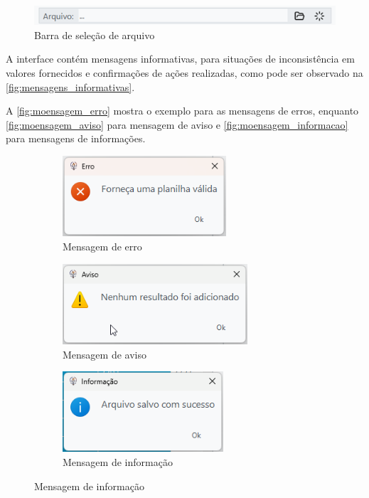 \begin{figure}[H]
	\centering
	\caption{Barra de seleção de arquivo}
	\label{fig:barra_selecao}
	\includegraphics[width=15cm]{illustrations/figures/barra_selecao.png}
\end{figure}

A interface contém mensagens informativas, para situações de inconsistência em valores fornecidos e confirmações de ações realizadas, como pode ser observado na \autoref{fig:mensagens_informativas}.

A \autoref{fig:moensagem_erro} mostra o exemplo para as mensagens de erros, enquanto \autoref{fig:moensagem_aviso} para mensagem de aviso e \autoref{fig:moensagem_informacao} para mensagens de informações.

\begin{figure}[H]
	\centering
	\caption{Mensagens informativas}
  \label{fig:mensagens_informativas}
	\begin{subfigure}{7.5cm}
		\centering
		\includegraphics[height=3cm]{illustrations/figures/mensagem_erro.png}
		\caption{Mensagem de erro}
		\label{fig:moensagem_erro}
	\end{subfigure}
  \begin{subfigure}{7.5cm}
		\centering
		\includegraphics[height=3cm]{illustrations/figures/mensagem_aviso_resultado.png}
		\caption{Mensagem de aviso}
		\label{fig:moensagem_aviso}
	\end{subfigure}
  \begin{subfigure}{7.5cm}
		\centering
		\includegraphics[height=3cm]{illustrations/figures/mensagem_informacao.png}
		\caption{Mensagem de informação}
		\label{fig:moensagem_informacao}
	\end{subfigure}
\end{figure}

